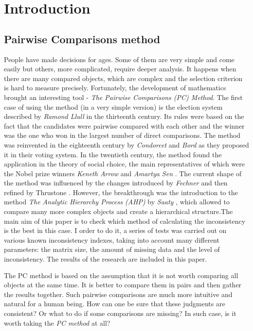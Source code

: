 \chapter{Introduction}
\label{cha:wprowadzenie}


\section{Pairwise Comparisons method}
\label{sec:metodaPorowan}
People have made decisions for ages. Some of them are very simple and come easily but others, more complicated, require deeper analysis. It happens when there are many compared objects, which are complex and the selection criterion is hard to measure precisely. Fortunately, the development of mathematics brought an interesting tool - \textit{The Pairwise Comparisons (PC) Method}. The first case of using the method (in a very simple version) is the election system described by \textit{Ramond Llull} \cite{Colomer2013} in the thirteenth century. Its rules were based on the fact that the candidates were pairwise compared with each other and the winner was the one who won in the largest number of direct comparisons. The method was reinvented in the eighteenth century by \textit{Condorcet} and \textit{Bord} \cite{Kulakowski2016} as they proposed it in their voting system. In the twentieth century, the method found the application in the theory of social choice, the main representatives of which were the Nobel prize winners \textit{Keneth Arrow} \cite{Arrow} and \textit{Amartya Sen} \cite{Sen}. The current shape of the method was influenced by the changes introduced by \textit{Fechner} and then refined by {Thrustone} \cite{Thurstone1994}. However, the breakthrough was the introduction to the method \textit\textit{The Analytic Hierarchy Process (AHP)} by \textit{Saaty} \cite{Saaty2008}, which allowed to compare many more complex objects and create a hierarchical structure.The main aim of this paper is to check which method of calculating the inconsistency is the best in this case. I order to do it, a series of tests was carried out on various known inconsistency indexes, taking into account many different parameters: the matrix size, the amount of missing data and the level of inconsistency. The results of the research are included in this paper.

The PC method is based on the assumption that it is not worth comparing all objects at the same time. It is better to compare them in pairs and then gather the results together. Such pairwise comparisons are much more intuitive and natural for a human being. How can one be sure that these judgments are consistent? Or what to do if some comparisons are missing? In such case, is it worth taking the \textit{PC method} at all?

